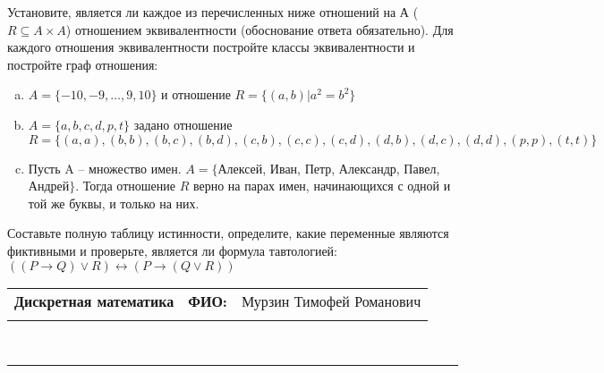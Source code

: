 \documentclass[10pt]{exam}
\newcommand{\class}{Дискретная математика}
\newcommand{\examdate}{}
\begin{document}
\begin{questions}
\question
Установите, является ли каждое из перечисленных ниже отношений на А ($R \subseteq A \times A$) отношением эквивалентности (обоснование ответа обязательно). Для каждого отношения эквивалентности постройте классы 
эквивалентности и постройте граф отношения:
\begin{enumerate} [a)]\setcounter{enumi}{0}
\item $A = \{-10, -9, … , 9, 10\}$ и отношение $R = \{(a,b)|a^{2} = b^{2}\}$
\item $A = \{a, b, c, d, p, t\}$ задано отношение $R = \{(a, a), (b, b), (b, c), (b, d), (c, b), (c, c), (c, d), (d, b), (d, c), (d, d), (p,p), (t,t)\}$
\item Пусть A – множество имен. $A = \{ $Алексей, Иван, Петр, Александр, Павел, Андрей$ \}$. Тогда отношение $R$ верно на парах имен, начинающихся с одной и той же буквы, и только на них.
\end{enumerate}\question Составьте полную таблицу истинности, определите, какие переменные являются фиктивными и проверьте, является ли формула тавтологией:
$((P \rightarrow Q) \lor R) \leftrightarrow (P \rightarrow (Q \lor R))$

\end{questions}
\newpage
\begin{flushright}
\begin{tabular}{p{2.8in} r l}
\textbf{\class} & \textbf{ФИО:} &Мурзин Тимофей Романович
\\

\textbf{\examdate} &&\\
\end{tabular}\\
\end{flushright}
\rule[1ex]{\textwidth}{.1pt}
\end{document}
